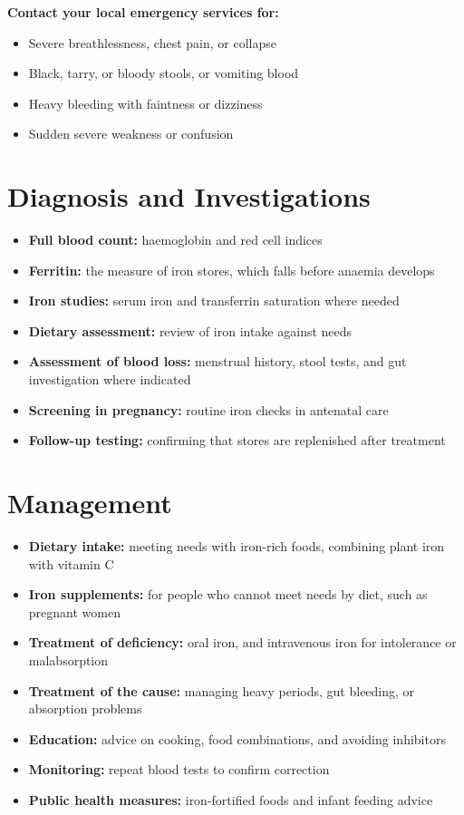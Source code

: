 \textbf{Contact your local emergency services for:}
\begin{itemize}
    \item Severe breathlessness, chest pain, or collapse
    \item Black, tarry, or bloody stools, or vomiting blood
    \item Heavy bleeding with faintness or dizziness
    \item Sudden severe weakness or confusion
\end{itemize}

\section*{Diagnosis and Investigations}
\begin{itemize}
    \item \textbf{Full blood count:} haemoglobin and red cell indices
    \item \textbf{Ferritin:} the measure of iron stores, which falls before anaemia develops
    \item \textbf{Iron studies:} serum iron and transferrin saturation where needed
    \item \textbf{Dietary assessment:} review of iron intake against needs
    \item \textbf{Assessment of blood loss:} menstrual history, stool tests, and gut investigation where indicated
    \item \textbf{Screening in pregnancy:} routine iron checks in antenatal care
    \item \textbf{Follow-up testing:} confirming that stores are replenished after treatment
\end{itemize}

\section*{Management}
\begin{itemize}
    \item \textbf{Dietary intake:} meeting needs with iron-rich foods, combining plant iron with vitamin C
    \item \textbf{Iron supplements:} for people who cannot meet needs by diet, such as pregnant women
    \item \textbf{Treatment of deficiency:} oral iron, and intravenous iron for intolerance or malabsorption
    \item \textbf{Treatment of the cause:} managing heavy periods, gut bleeding, or absorption problems
    \item \textbf{Education:} advice on cooking, food combinations, and avoiding inhibitors
    \item \textbf{Monitoring:} repeat blood tests to confirm correction
    \item \textbf{Public health measures:} iron-fortified foods and infant feeding advice
\end{itemize}


